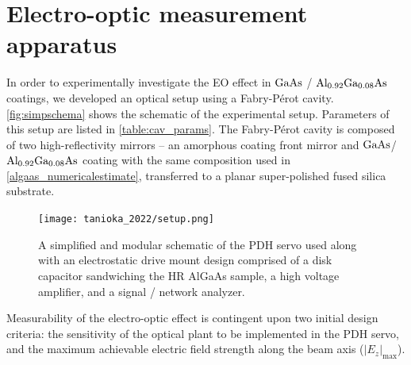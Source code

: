 


\section{Electro-optic measurement apparatus}\label{tanioka2022}

In order to experimentally investigate the EO effect in $\mathrm{GaAs}$ / $\mathrm{Al_{0.92}Ga_{0.08}As}$ coatings, we developed an optical setup using a Fabry-P\'erot cavity. \autoref{fig:simpschema} shows the schematic of the experimental setup. Parameters of this setup are listed in \autoref{table:cav_params}. The Fabry-P\'erot cavity is composed of two high-reflectivity mirrors -- an amorphous coating front mirror and $\mathrm{GaAs}$/$\mathrm{Al_{0.92}Ga_{0.08}As}$ coating with the same composition used in \autoref{algaas_numericalestimate}, transferred to a planar super-polished fused silica substrate. 

\begin{figure}[H]
    \centering
	\texttt{[image: tanioka\_2022/setup.png]}
	\caption{A simplified and modular schematic of the PDH servo used along with an electrostatic drive mount design comprised of a disk capacitor sandwiching the HR AlGaAs sample, a high voltage amplifier, and a signal / network analyzer.}
\label{fig:simpschema}
\end{figure}
 Measurability of the electro-optic effect is contingent upon two initial design criteria: the sensitivity of the optical plant to be implemented in the PDH servo, and the maximum achievable electric field strength along the beam axis ($|E_z|_\mathrm{max}$). 

